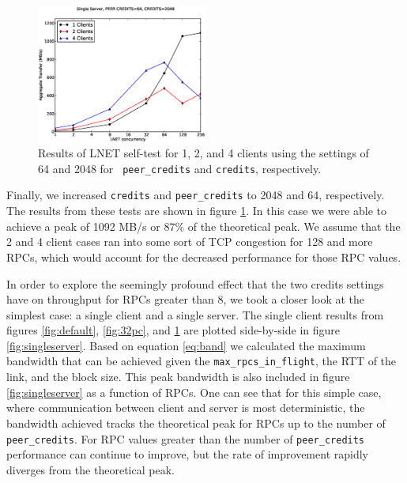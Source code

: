 \documentclass[]{sigplan-proc}
\begin{document}
\begin{figure}
\centering
\includegraphics[width=0.50\textwidth]{figures/64pc_plot.eps}
\caption{Results of LNET self-test for 1, 2, and 4 clients using the settings of 64 and 2048 for {\tt
    peer\_credits} and {\tt credits}, respectively.}
\label{fig:64pc}
\end{figure}

Finally, we increased {\tt credits} and {\tt peer\_credits} to 2048 and 64, respectively. The results from
these tests are shown in figure \ref{fig:64pc}. In this case we were able to achieve a peak of 1092 MB/s or
87\% of the theoretical peak. We assume that the 2 and 4 client cases ran into some sort of TCP congestion for
128 and more RPCs, which would account for the decreased performance for those RPC values.

In order to explore the seemingly profound effect that the two credits settings have on throughput for RPCs
greater than 8, we took a closer look at the simplest case: a single client and a single server. The single
client results from figures \ref{fig:default}, \ref{fig:32pc}, and \ref{fig:64pc} are plotted side-by-side in
figure \ref{fig:singleserver}. Based on equation \ref{eq:band} we calculated the maximum bandwidth that can
be achieved given the {\tt max\_rpcs\_in\_flight}, the RTT of the link, and the block size.
This peak bandwidth is also included in figure \ref{fig:singleserver} as a function of RPCs. One can see that
for this simple case, where communication between client and server is most deterministic, the bandwidth
achieved tracks the theoretical peak for RPCs up to the number of {\tt peer\_credits}. For RPC values greater
than the number of {\tt peer\_credits} performance can continue to improve, but the rate of improvement
rapidly diverges from the theoretical peak. 
\end{document}

